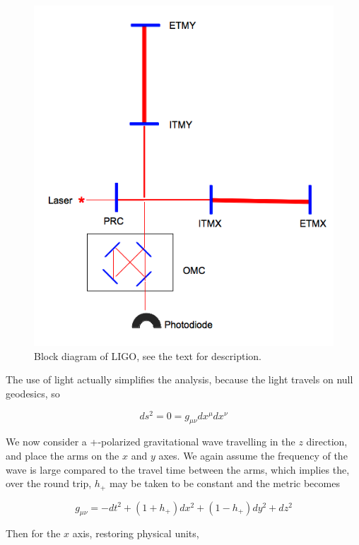 \begin{figure}
  \includegraphics[width=\linewidth]{figures/detectors/LIGO}
  \caption[Block diagram of LIGO]{
  \label{f:ligo}
Block diagram of LIGO, see the text for description.
}
\end{figure}%
The use of light actually simplifies the analysis, because the light
travels on null geodesics, so

\begin{equation*}
ds^2 = 0 = g_{\mu\nu} dx^\mu dx^\nu
\end{equation*}

We now consider a +-polarized gravitational wave travelling in the $z$
direction, and place the arms on the $x$ and $y$ axes.  We again
assume the frequency of the wave is large compared to the travel time
between the arms, which implies the, over the round trip, $h_+$ may be
taken to be constant and the metric becomes

\begin{equation*}
g_{\mu\nu} = -dt^2 + (1+h_+) dx^2 + (1-h_+) dy^2 + dz^2
\end{equation*}

Then for the $x$ axis, restoring physical units,

